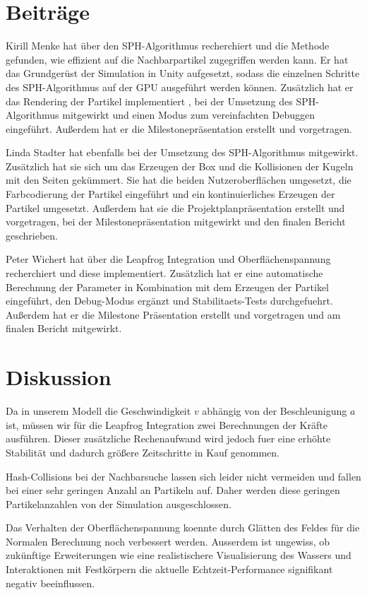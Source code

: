 \documentclass[a4paper]{paper}
\begin{document}
\section{Beiträge}
Kirill Menke hat über den SPH-Algorithmus recherchiert und die Methode gefunden, wie 
effizient auf die Nachbarpartikel zugegriffen werden kann. Er hat das Grundgerüst der Simulation in Unity aufgesetzt, sodass die einzelnen Schritte des SPH-Algorithmus auf der GPU ausgeführt werden können. Zusätzlich hat er das Rendering der Partikel implementiert , bei der Umsetzung des SPH-Algorithmus mitgewirkt und einen Modus zum vereinfachten Debuggen eingeführt. Außerdem hat er die Milestonepräsentation erstellt und vorgetragen. 

Linda Stadter hat ebenfalls bei der Umsetzung des SPH-Algorithmus mitgewirkt. Zusätzlich hat sie sich um das Erzeugen der Box und die Kollisionen der Kugeln mit den Seiten gekümmert. Sie hat die beiden Nutzeroberflächen umgesetzt, die Farbcodierung der Partikel eingeführt und ein kontinuierliches Erzeugen der Partikel umgesetzt. Außerdem hat sie die Projektplanpräsentation erstellt und vorgetragen, bei der Milestonepräsentation mitgewirkt und den finalen Bericht geschrieben.

Peter Wichert hat über die Leapfrog Integration und Oberflächenspannung recherchiert und diese implementiert. Zusätzlich hat er eine automatische Berechnung der Parameter in Kombination mit dem Erzeugen der Partikel eingeführt, den Debug-Modus ergänzt und Stabilitaets-Tests durchgefuehrt. Außerdem hat er die Milestone Präsentation erstellt und vorgetragen und am finalen Bericht mitgewirkt.



\section{Diskussion}
Da in unserem Modell die Geschwindigkeit $v$ abhängig von der Beschleunigung $a$ ist, müssen wir für die Leapfrog Integration zwei Berechnungen der Kräfte ausführen. Dieser zusätzliche Rechenaufwand wird jedoch fuer eine erhöhte Stabilität und dadurch größere Zeitschritte in Kauf genommen. 


Hash-Collisions bei der Nachbarsuche lassen sich leider nicht vermeiden und fallen bei einer sehr geringen Anzahl an Partikeln auf. Daher werden diese geringen Partikelanzahlen von der Simulation ausgeschlossen. 

Das Verhalten der Oberflächenspannung koennte durch Glätten des Feldes für die Normalen Berechnung noch verbessert werden.
Ausserdem ist ungewiss, ob zukünftige Erweiterungen wie eine realistischere Visualisierung des Wassers und Interaktionen mit Festkörpern die aktuelle Echtzeit-Performance signifikant negativ beeinflussen.
\end{document}
